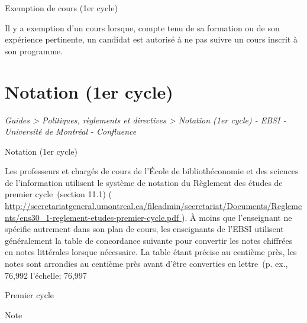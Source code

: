 \documentclass [12 pt]{article}
\begin{document}
        Exemption de cours (1er cycle)
        
            Il y a exemption d'un cours lorsque, compte tenu de sa formation ou de son expérience
                pertinente, un candidat est autorisé à ne pas suivre un cours inscrit à son
                programme.
        
    
    
        \newpage
        \section {
        Notation (1er cycle)
        }
        
        
        
        \textit{
        Guides > Politiques, règlements et directives > Notation (1er cycle) - EBSI -
            Université de Montréal - Confluence
        }
    
        Notation (1er cycle)
        
            Les professeurs et chargés de cours de l'École de bibliothéconomie et des sciences de
                l'information utilisent le système de notation du Règlement des études de premier
                cycle (section 11.1) (
        \href{
        http://secretariatgeneral.umontreal.ca/fileadmin/secretariat/Documents/Reglements/ens30_1-reglement-etudes-premier-cycle.pdf
        } {
        http://secretariatgeneral.umontreal.ca/fileadmin/secretariat/Documents/Reglements/ens30_1-reglement-etudes-premier-cycle.pdf
        }
    ).
                À moins que l'enseignant ne spécifie autrement dans son plan de cours, les
                enseignants de l'EBSI utilisent généralement la table de concordance suivante pour
                convertir les notes chiffrées en notes littérales lorsque nécessaire. La table étant
                précise au centième près, les notes sont arrondies au centième près avant d'être
                converties en lettre (p. ex., 76,992 %
                l'échelle; 76,997 %
            
                
                    
                        
                            
                                Premier cycle
                            
                            
                                Note
                            
\end{document}
